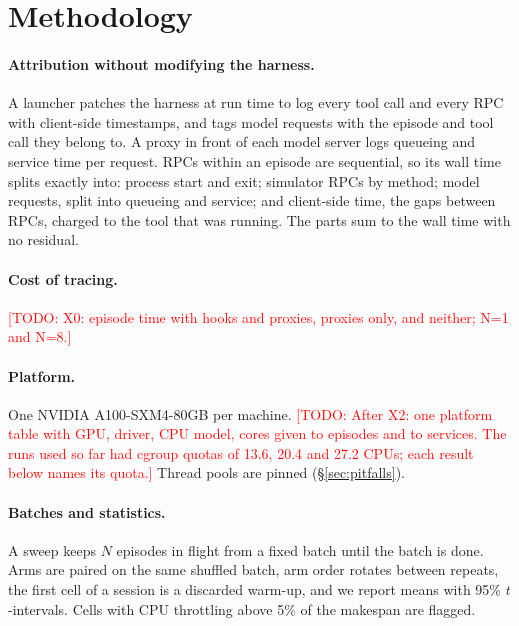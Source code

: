\documentclass[conference,10pt]{IEEEtran}
\newcommand{\pct}[1]{#1\%}
\newcommand{\todo}[1]{\textcolor{red}{[TODO: #1]}}
\begin{document}
\section{Methodology}\label{sec:method}

\paragraph{Attribution without modifying the harness.} A launcher patches the harness at
run time to log every tool call and every RPC with client-side timestamps, and tags model
requests with the episode and tool call they belong to. A proxy in front of each model
server logs queueing and service time per request. RPCs within an episode are sequential,
so its wall time splits exactly into: process start and exit; simulator RPCs by method;
model requests, split into queueing and service; and client-side time, the gaps between
RPCs, charged to the tool that was running. The parts sum to the wall time with no residual.

\paragraph{Cost of tracing.} \todo{X0: episode time with hooks and proxies, proxies only,
and neither; N=1 and N=8.}

\paragraph{Platform.} One NVIDIA A100-SXM4-80GB per machine. \todo{After X2: one platform
table with GPU, driver, CPU model, cores given to episodes and to services. The runs used so
far had cgroup quotas of 13.6, 20.4 and 27.2 CPUs; each result below names its quota.}
Thread pools are pinned (\S\ref{sec:pitfalls}).

\paragraph{Batches and statistics.} A sweep keeps $N$ episodes in flight from a fixed batch
until the batch is done. Arms are paired on the same shuffled batch, arm order rotates
between repeats, the first cell of a session is a discarded warm-up, and we report means
with 95\% $t$-intervals. Cells with CPU throttling above \pct{5} of the makespan are flagged.

\end{document}
